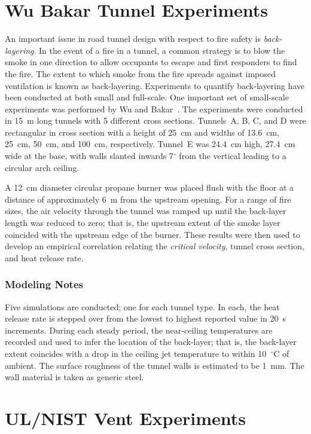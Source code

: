 \section{Wu Bakar Tunnel Experiments}
\label{Wu_Bakar_Tunnels_Description}

An important issue in road tunnel design with respect to fire safety is {\em back-layering}. In the event of a fire in a tunnel, a common strategy is to blow the smoke in one direction to allow occupants to escape and first responders to find the fire. The extent to which smoke from the fire spreads against imposed ventilation is known as back-layering. Experiments to quantify back-layering have been conducted at both small and full-scale. One important set of small-scale experiments was performed by Wu and Bakar~\cite{Wu:FSJ2000}. The experiments were conducted in 15~m long tunnels with 5 different cross sections. Tunnels~A, B, C, and D were rectangular in cross section with a height of 25~cm and widths of 13.6~cm, 25~cm, 50~cm, and 100~cm, respectively. Tunnel~E was 24.4~cm high, 27.4~cm wide at the base, with walls slanted inwards 7$^\circ$ from the vertical leading to a circular arch ceiling.

A 12~cm diameter circular propane burner was placed flush with the floor at a distance of approximately 6~m from the upstream opening. For a range of fire sizes, the air velocity through the tunnel was ramped up until the back-layer length was reduced to zero; that is, the upstream extent of the smoke layer coincided with the upstream edge of the burner. These results were then used to develop an empirical correlation relating the {\em critical velocity}, tunnel cross section, and heat release rate.

\subsubsection{Modeling Notes}

Five simulations are conducted; one for each tunnel type. In each, the heat release rate is stepped over from the lowest to highest reported value in 20~s increments. During each steady period, the near-ceiling temperatures are recorded and used to infer the location of the back-layer; that is, the back-layer extent coincides with a drop in the ceiling jet temperature to within 10~$^\circ$C of ambient. The surface roughness of the tunnel walls is estimated to be 1~mm. The wall material is taken as generic steel.


\section{UL/NIST Vent Experiments}
\label{UL_NIST_Vents_Description}

